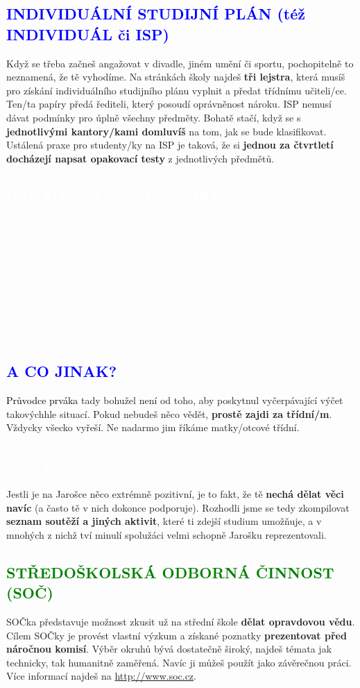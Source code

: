 \documentclass[a5paper, twoside]{article}
\newcommand{\boxik}[2]{
  \begin{tcolorbox}[
    sharp corners,
    colback = #1,
    boxrule = 0pt,
    grow to left by = 25pt,
    grow to right by = 25pt,
    right = 22pt,
    left = 22pt%
  ]
    #2
  \end{tcolorbox}
}
\newcommand{\nadpis}[4]{
  \vspace*{-50pt}
  \begin{tcolorbox}[colback = #2, boxrule = 0pt, grow to left by = #4,  grow to right by = #4, arc=8pt, height = 40pt]
    \vspace*{5pt}
    \centering \section*{\textcolor{#3}{#1}}
  \end{tcolorbox}
}
\newcommand{\podnadpis}[2]{
  \subsection*{\textcolor{#2}{#1}}
}
\begin{document}
\podnadpis{INDIVIDUÁLNÍ STUDIJNÍ PLÁN (též INDIVIDUÁL či ISP)}{blue}
Když se třeba začneš angažovat v divadle, jiném umění či sportu, pochopitelně to neznamená, že tě vyhodíme. Na stránkách školy najdeš \textbf{tři lejstra}, která musíš pro získání individuálního studijního plánu vyplnit a předat třídnímu učiteli/ce. Ten/ta papíry předá řediteli, který posoudí oprávněnost nároku.
ISP nemusí dávat podmínky pro úplně všechny předměty. Bohatě stačí, když se
s \textbf{jednotlivými kantory/kami domluvíš} na tom, jak se bude klasifikovat. Ustálená praxe pro studenty/ky na ISP je taková, že si \textbf{jednou za čtvrtletí docházejí napsat opakovací testy} z jednotlivých předmětů.


\smallskip
\boxik{blue}{\vspace{-10pt}\textcolor{white}{\subsection*{OMLUVENÍ Z TĚLOCVIKU}
\medskip
  To by jen tak nešlo. Nejdřív ti \textbf{doktor/ka musí vydat nějaké lejstro} či potvrzení o~tom, že do toho tělocviku prostě nemůžeš chodit, pak ho předáš nám a... jsi omluven/a. Bude tam ještě trocha papírování, ale snažíme se vycházet vstříc (nebudeme, proboha, nikoho nutit cvičit se sádrou). V prváku také podstupujeme \textbf{test plavecké zdatnosti}, kterému se nevyhneš bez uvolnění. Pokud na něj v prváku nepřijdeš, půjdeš ve druháku. Tak důslední jsme. (Pokud nepřijdeš ve druháku, přijdeš ve třeťáku. Pokud nepřijdeš ve třeťáku a zvolíš si vodácký kurz, budeš zkoušky provádět na místě před všemi svými spolužáky/ačkami.)}}

\podnadpis{A CO JINAK?}{blue}
\textcolor{black}{\Kapitan Průvodce prváka} tady bohužel není od toho, aby poskytnul vyčerpávající výčet takovýchhle situací. Pokud nebudeš něco vědět, \textbf{prostě zajdi za třídní/m}. Vždycky všecko vyřeší. Ne nadarmo jim říkáme matky/otcové třídní.

\newpage

\nadpis{SOUTĚŽE}{green}{white}{-4.7cm}

\noindent Jestli je na Jarošce něco extrémně pozitivní, je to fakt, že tě \textbf{nechá dělat věci navíc} (a často tě v nich dokonce podporuje). Rozhodli jsme se tedy zkompilovat \textbf{seznam soutěží a jiných aktivit}, které ti zdejší studium umožňuje, a v mnohých z nichž tví minulí spolužáci velmi schopně Jarošku reprezentovali.

\podnadpis{STŘEDOŠKOLSKÁ ODBORNÁ ČINNOST (SOČ)}{green}
SOČka představuje možnost zkusit už na střední škole \textbf{dělat opravdovou vědu}.
Cílem SOČky je provést vlastní výzkum a získané poznatky \textbf{prezentovat před náročnou komisí}.
Výběr okruhů bývá dostatečně široký, najdeš témata jak technicky, tak humanitně zaměřená.
Navíc ji můžeš použít jako závěrečnou práci.
Více informací najdeš na \url{http://www.soc.cz}.
\end{document}
